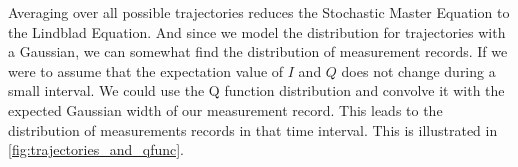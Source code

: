 Averaging over all possible trajectories reduces the Stochastic Master Equation to the Lindblad Equation. And since we model the distribution for trajectories with a Gaussian, we can somewhat find the distribution of measurement records. If we were to assume that the expectation value of $I$ and $Q$ does not change during a small interval. We could use the Q function distribution and convolve it with the expected Gaussian width of our measurement record. This leads to the distribution of measurements records in that time interval. This is illustrated in \ref{fig:trajectories_and_qfunc}.











